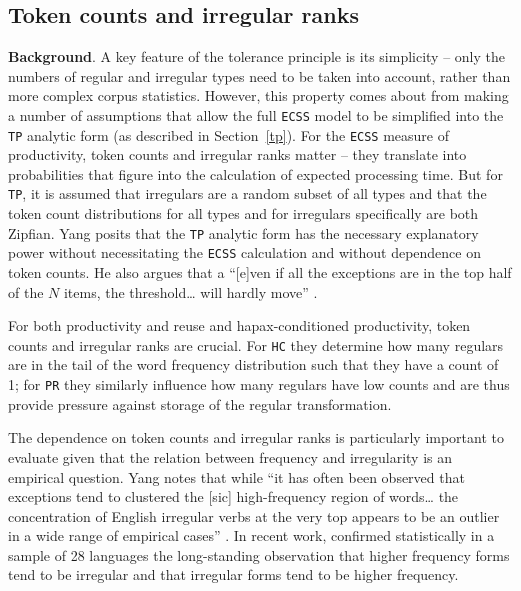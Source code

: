 \documentclass[
   11pt,
       ]{book}
\begin{document}
\hypertarget{token-counts-and-irregular-ranks}{%
\subsection{Token counts and irregular ranks}\label{token-counts-and-irregular-ranks}}

\textbf{Background}. A key feature of the tolerance principle is its simplicity --
only the numbers of regular and irregular types need to be taken into account,
rather than more complex corpus statistics. However, this property comes about
from making a number of assumptions that allow the full \texttt{ECSS} model to be
simplified into the \texttt{TP} analytic form (as described in Section~\ref{tp}). For
the \texttt{ECSS} measure of productivity, token counts and irregular ranks matter --
they translate into probabilities that figure into the calculation of expected
processing time. But for \texttt{TP}, it is assumed that irregulars are a random subset
of all types and that the token count distributions for all types and for
irregulars specifically are both Zipfian. Yang posits that the \texttt{TP} analytic
form has the necessary explanatory power without necessitating the \texttt{ECSS}
calculation and without dependence on token counts. He also argues that a
``{[}e{]}ven if all the exceptions are in the top half of the \(N\) items, the
threshold\ldots{} will hardly move'' \citep[p.~65]{yang2016}.

For both productivity and reuse and hapax-conditioned productivity, token counts
and irregular ranks are crucial. For \texttt{HC} they determine how many regulars are
in the tail of the word frequency distribution such that they have a count of 1;
for \texttt{PR} they similarly influence how many regulars have low counts and are thus
provide pressure against storage of the regular transformation.

The dependence on token counts and irregular ranks is particularly important to
evaluate given that the relation between frequency and irregularity is an
empirical question. Yang notes that while ``it has often been observed that
exceptions tend to clustered the {[}sic{]} high-frequency region of words\ldots{} the
concentration of English irregular verbs at the very top appears to be an
outlier in a wide range of empirical cases'' \citep[p.~65]{yang2016}. In recent work,
\citet{wu2019} confirmed statistically in a sample of 28 languages the long-standing
observation that higher frequency forms tend to be irregular and that irregular
forms tend to be higher frequency.
\end{document}
